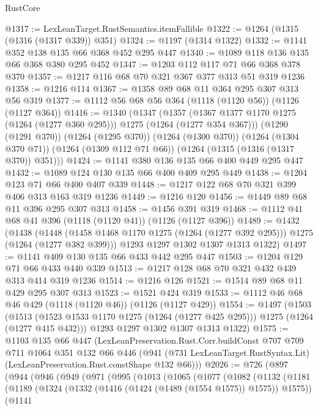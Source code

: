 \begin{lexlean}{RustCore}
\begin{coremodule}
@1317 := LexLeanTarget.RustSemantics.itemFallible
@1322 := @1264 (@1315 (@1316 (@1317 @339)) @351)
@1324 := @1197 (@1314 @1322)
@1332 := @1141 @352 @138 @135 @66 @368 @452 @295 @447
@1340 := @1089 @118 @136 @135 @66 @368 @380 @295 @452
@1347 := @1203 @112 @117 @71 @66 @368 @378 @370
@1357 := @1217 @116 @68 @70 @321 @367 @377 @313 @51 @319 @1236
@1358 := @1216 @114
@1367 := @1358 @89 @68 @11 @364 @295 @307 @313 @56 @319
@1377 := @1112 @56 @68 @56 @364 (@1118 (@1120 @56)) (@1126 (@1127 @364))
@1416 := @1340
    (@1347
      (@1357 (@1367 @1377 @1170 @1275 (@1264 (@1277 @360 @295))) @1275 (@1264 (@1277 @354 @367)))
      (@1290 (@1291 @370))
      (@1264 (@1295 @370))
      (@1264 (@1300 @370))
      (@1264 (@1304 @370 @71))
      (@1264 (@1309 @112 @71 @66))
      (@1264 (@1315 (@1316 (@1317 @370)) @351)))
@1424 := @1141 @380 @136 @135 @66 @400 @449 @295 @447
@1432 := @1089 @124 @130 @135 @66 @400 @409 @295 @449
@1438 := @1204 @123 @71 @66 @400 @407 @339
@1448 := @1217 @122 @68 @70 @321 @399 @406 @313 @163 @319 @1236
@1449 := @1216 @120
@1456 := @1449 @89 @68 @11 @396 @295 @307 @313
@1458 := @1456 @391 @319
@1468 := @1112 @41 @68 @41 @396 (@1118 (@1120 @41)) (@1126 (@1127 @396))
@1489 := @1432
    (@1438
      (@1448 (@1458 @1468 @1170 @1275 (@1264 (@1277 @392 @295))) @1275 (@1264 (@1277 @382 @399)))
      @1293
      @1297
      @1302
      @1307
      @1313
      @1322)
@1497 := @1141 @409 @130 @135 @66 @433 @442 @295 @447
@1503 := @1204 @129 @71 @66 @433 @440 @339
@1513 := @1217 @128 @68 @70 @321 @432 @439 @313 @414 @319 @1236
@1514 := @1216 @126
@1521 := @1514 @89 @68 @11 @429 @295 @307 @313
@1523 := @1521 @424 @319
@1533 := @1112 @46 @68 @46 @429 (@1118 (@1120 @46)) (@1126 (@1127 @429))
@1554 := @1497
    (@1503
      (@1513 (@1523 @1533 @1170 @1275 (@1264 (@1277 @425 @295))) @1275 (@1264 (@1277 @415 @432)))
      @1293
      @1297
      @1302
      @1307
      @1313
      @1322)
@1575 := @1103
    @135
    @66
    @447
    (LexLeanPreservation.Rust.Corr.buildConst
      @707
      @709
      @711
      @1064
      @351
      @132
      @66
      @446
      (@941 (@731 LexLeanTarget.RustSyntax.Lit) (LexLeanPreservation.Rust.constShape @132 @66)))
@2026 := @726
    (@897
      (@944
        (@946
          (@949
            (@971
              (@995
                (@1013
                  (@1065
                    (@1077
                      (@1082
                        (@1132
                          (@1181
                            (@1189
                              (@1324 (@1332 (@1416 (@1424 (@1489 (@1554 @1575)) @1575)) @1575))
                              (@1141

\end{coremodule}
\end{lexlean}
